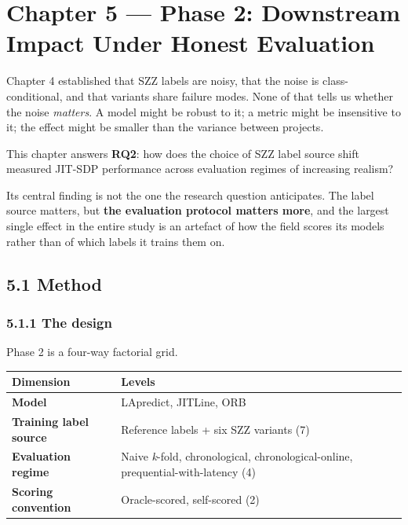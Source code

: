 \chapter{Chapter 5 --- Phase 2: Downstream Impact Under Honest
Evaluation}\label{chapter-5-phase-2-downstream-impact-under-honest-evaluation}

Chapter 4 established that SZZ labels are noisy, that the noise is
class-conditional, and that variants share failure modes. None of that
tells us whether the noise \emph{matters}. A model might be robust to
it; a metric might be insensitive to it; the effect might be smaller
than the variance between projects.

This chapter answers \textbf{RQ2}: how does the choice of SZZ label
source shift measured JIT-SDP performance across evaluation regimes of
increasing realism?

Its central finding is not the one the research question anticipates.
The label source matters, but \textbf{the evaluation protocol matters
more}, and the largest single effect in the entire study is an artefact
of how the field scores its models rather than of which labels it trains
them on.

\section{5.1 Method}\label{method}

\subsection{5.1.1 The design}\label{the-design}

Phase 2 is a four-way factorial grid.

\begin{longtable}[]{@{}
  >{\raggedright\arraybackslash}p{}
  >{\raggedright\arraybackslash}p{}@{}}
\toprule\noalign{}
\begin{minipage}[b]{\linewidth}\raggedright
Dimension
\end{minipage} & \begin{minipage}[b]{\linewidth}\raggedright
Levels
\end{minipage} \\
\midrule\noalign{}
\endhead
\bottomrule\noalign{}
\endlastfoot
\textbf{Model} & LApredict, JITLine, ORB \\
\textbf{Training label source} & Reference labels + six SZZ variants
(7) \\
\textbf{Evaluation regime} & Naive \emph{k}-fold, chronological,
chronological-online, prequential-with-latency (4) \\
\textbf{Scoring convention} & Oracle-scored, self-scored (2) \\
\end{longtable}

